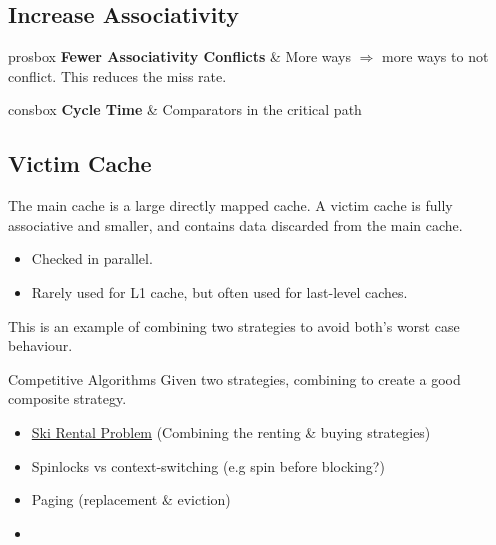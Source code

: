 \subsection{Increase Associativity}

\begin{tabbox}{prosbox}
	\textbf{Fewer Associativity Conflicts} & More ways $\Rightarrow$ more ways to not conflict. This reduces the miss rate.\\
\end{tabbox}
\begin{tabbox}{consbox}
	\textbf{Cycle Time} & Comparators in the critical path
\end{tabbox}

\subsection{Victim Cache}
The main cache is a large directly mapped cache. A victim cache is fully associative and smaller, and contains data discarded from the main cache.
\begin{itemize}
	\item Checked in parallel.
	\item Rarely used for L1 cache, but often used for last-level caches.
\end{itemize}
This is an example of combining two strategies to avoid both's worst case behaviour.
\begin{sidenotebox}{Competitive Algorithms}
	Given two strategies, combining to create a good composite strategy.
	\begin{itemize}
		\item \href{https://en.wikipedia.org/wiki/Ski_rental_problem}{Ski Rental Problem} (Combining the renting \& buying strategies)
		\item Spinlocks vs context-switching (e.g spin before blocking?)
		\item Paging (replacement \& eviction)
		\item
	\end{itemize}
\end{sidenotebox}

